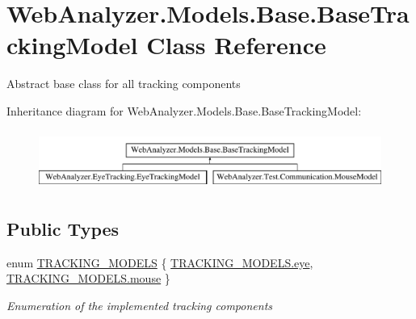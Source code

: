 \hypertarget{class_web_analyzer_1_1_models_1_1_base_1_1_base_tracking_model}{}\section{Web\+Analyzer.\+Models.\+Base.\+Base\+Tracking\+Model Class Reference}
\label{class_web_analyzer_1_1_models_1_1_base_1_1_base_tracking_model}


Abstract base class for all tracking components  


Inheritance diagram for Web\+Analyzer.\+Models.\+Base.\+Base\+Tracking\+Model\+:\begin{figure}[H]
\begin{center}
\leavevmode
\includegraphics[height=1.937716cm]{class_web_analyzer_1_1_models_1_1_base_1_1_base_tracking_model}
\end{center}
\end{figure}
\subsection*{Public Types}
\begin{DoxyCompactItemize}
\item 
enum \hyperlink{class_web_analyzer_1_1_models_1_1_base_1_1_base_tracking_model_a1a4a0f40cfe65595918f6a41023798ff}{T\+R\+A\+C\+K\+I\+N\+G\+\_\+\+M\+O\+D\+E\+L\+S} \{ \hyperlink{class_web_analyzer_1_1_models_1_1_base_1_1_base_tracking_model_a1a4a0f40cfe65595918f6a41023798ffaf19bd0844e53369373385609e28dbf84}{T\+R\+A\+C\+K\+I\+N\+G\+\_\+\+M\+O\+D\+E\+L\+S.\+eye}, 
\hyperlink{class_web_analyzer_1_1_models_1_1_base_1_1_base_tracking_model_a1a4a0f40cfe65595918f6a41023798ffa40203abe6e81ed98cbc97cdd6ec4f144}{T\+R\+A\+C\+K\+I\+N\+G\+\_\+\+M\+O\+D\+E\+L\+S.\+mouse}
 \}\begin{DoxyCompactList}\small\item\em Enumeration of the implemented tracking components \end{DoxyCompactList}
\end{DoxyCompactItemize}
